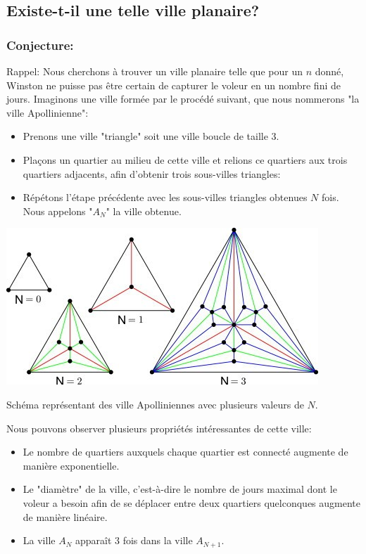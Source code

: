 \subsection{Existe-t-il une telle ville planaire?}
\subsubsection{Conjecture:}
Rappel: Nous cherchons à trouver un ville planaire telle que pour un $n$ donné, Winston ne puisse pas être certain de capturer le voleur en un nombre fini de jours. Imaginons une ville formée par le procédé suivant, que nous nommerons "la ville Apollinienne":

\medskip
\begin{itemize}
    \item Prenons une ville "triangle" soit une ville boucle de taille 3.
    \item Plaçons un quartier au milieu de cette ville et relions ce quartiers aux trois quartiers adjacents, afin d'obtenir trois sous-villes triangles:
    \item Répétons l'étape précédente avec les sous-villes triangles obtenues $N$ fois. Nous appelons "$A_N$" la ville obtenue.
\end{itemize}
\medskip
\begin{figureleg}
\begin{center}
\includegraphics[scale=0.7]{1-s2.0-S0166218X14000195-gr2 (1).jpg}

\medskip

Schéma représentant des ville Apolliniennes avec plusieurs valeurs de $N$.
\end{center}
\end{figureleg}
\medskip
Nous pouvons observer plusieurs propriétés intéressantes de cette ville: 
\begin{itemize}
    \item Le nombre de quartiers auxquels chaque quartier est connecté augmente de manière exponentielle.
    \item Le "diamètre" de la ville, c'est-à-dire le nombre de jours maximal dont le voleur a besoin afin de se déplacer entre deux quartiers quelconques augmente de manière linéaire.
    \item La ville $A_N$ apparaît 3 fois dans la ville $A_{N+1}$.
\end{itemize}

